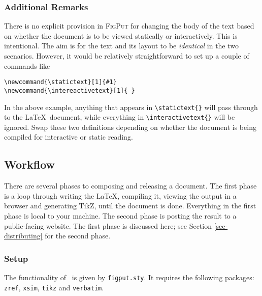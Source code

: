 \documentclass[10pt]{article}
\begin{document}
\subsubsection*{Additional Remarks}

There is no explicit provision in \textsc{FigPut} for changing the
body of the text based on whether the document is to be viewed statically
or interactively. This is intentional. The aim is for the text and its
layout to be \emph{identical} in the two scenarios. However, it would
be relatively straightforward to set up a couple of commands like
\begin{verbatim}
\newcommand{\statictext}[1]{#1}
\newcommand{\intereactivetext}[1]{ }
\end{verbatim}
In the above example, anything that appears in \verb=\statictext{}=
will pass through to the \LaTeX\ document, while everything in
\verb=\interactivetext{}= will be ignored. Swap these two definitions
depending on whether the document is being compiled for interactive or
static reading.

\subsection{Workflow}

There are several phases to composing and releasing a document. The
first phase is a loop through writing the \LaTeX, compiling it, viewing
the output in a browser and generating TikZ, until the document is
done. Everything in the first phase is local to your machine. The
second phase is posting the result to a public-facing website. The
first phase is discussed here; see Section \ref{sec-distributing} for
the second phase.

\subsubsection*{Setup}

The functionality of \figput\ is given by {\tt figput.sty}. It
requires the following packages: {\tt zref}, {\tt xsim}, {\tt tikz}
and {\tt verbatim}.
\end{document}
